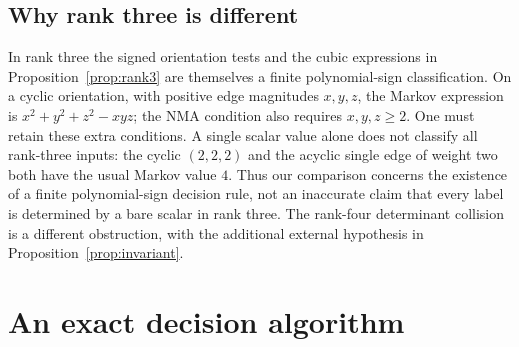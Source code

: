 \documentclass[11pt]{amsart}
\theoremstyle{definition}\newtheorem{definition}[theorem]{Definition}
\theoremstyle{remark}\newtheorem{remark}[theorem]{Remark}
\begin{document}
\subsection{Why rank three is different}
In rank three the signed orientation tests and the cubic expressions in Proposition~\ref{prop:rank3} are themselves a finite polynomial-sign classification. On a cyclic orientation, with positive edge magnitudes $x,y,z$, the Markov expression is $x^2+y^2+z^2-xyz$; the NMA condition also requires $x,y,z\ge2$. One must retain these extra conditions. A single scalar value alone does not classify all rank-three inputs: the cyclic $(2,2,2)$ and the acyclic single edge of weight two both have the usual Markov value $4$. Thus our comparison concerns the existence of a finite polynomial-sign decision rule, not an inaccurate claim that every label is determined by a bare scalar in rank three. The rank-four determinant collision is a different obstruction, with the additional external hypothesis in Proposition~\ref{prop:invariant}.

\section{An exact decision algorithm}\label{sec:algorithm}
\end{document}
